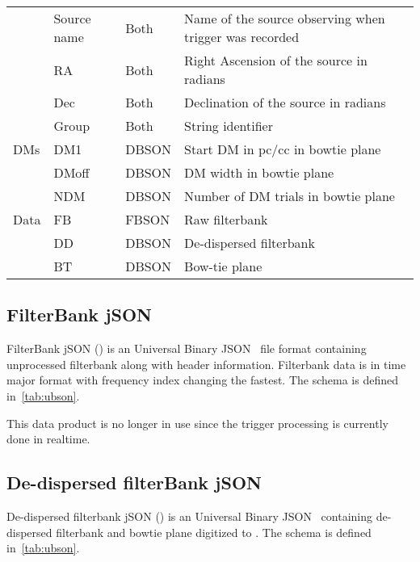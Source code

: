 \begin{table}
\begin{tabular}{llll}
																	& Source name & Both    & Name of the source observing when trigger was recorded \\
																	& RA          & Both    & Right Ascension of the source in radians               \\
																	& Dec         & Both    & Declination of the source in radians                   \\
																	& Group       & Both    & String identifier                                      \\
		DMs                         & DM1         & DBSON   & Start DM in pc/cc in bowtie plane                      \\
																& DMoff       & DBSON   & DM width in bowtie plane                               \\
																& NDM         & DBSON   & Number of DM trials in bowtie plane                    \\
		Data                        & FB          & FBSON   & Raw filterbank                                         \\
																& DD          & DBSON   & De-dispersed filterbank                                \\
																& BT          & DBSON   & Bow-tie plane                                          \\ \hline
	\end{tabular}
\end{table}
\subsection {FilterBank jSON}
\par FilterBank jSON (\fbson) is an Universal Binary JSON~\cite{ubjson} file format containing unprocessed filterbank along with header information. Filterbank data is in time major format with frequency index changing the fastest.
The schema is defined in~\autoref{tab:ubson}. 
\par This data product is no longer in use since the trigger processing is currently done in realtime.
\subsection {De-dispersed filterBank jSON}
\par De-dispersed filterbank jSON (\dbson) is an Universal Binary JSON~\cite{ubjson} containing de-dispersed filterbank and bowtie plane digitized to \uchar.
The schema is defined in~\autoref{tab:ubson}.
